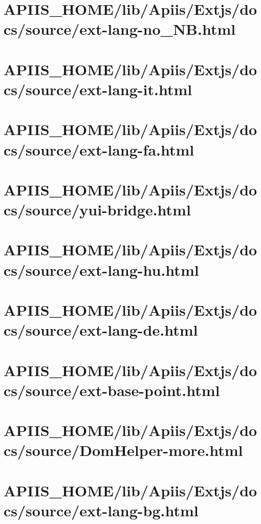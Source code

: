 \section{APIIS\_HOME/lib/Apiis/Extjs/docs/source/ext-lang-no\_NB.html} 
\section{APIIS\_HOME/lib/Apiis/Extjs/docs/source/ext-lang-it.html} 
\section{APIIS\_HOME/lib/Apiis/Extjs/docs/source/ext-lang-fa.html} 
\section{APIIS\_HOME/lib/Apiis/Extjs/docs/source/yui-bridge.html} 
\section{APIIS\_HOME/lib/Apiis/Extjs/docs/source/ext-lang-hu.html} 
\section{APIIS\_HOME/lib/Apiis/Extjs/docs/source/ext-lang-de.html} 
\section{APIIS\_HOME/lib/Apiis/Extjs/docs/source/ext-base-point.html} 
\section{APIIS\_HOME/lib/Apiis/Extjs/docs/source/DomHelper-more.html} 
\section{APIIS\_HOME/lib/Apiis/Extjs/docs/source/ext-lang-bg.html} 
